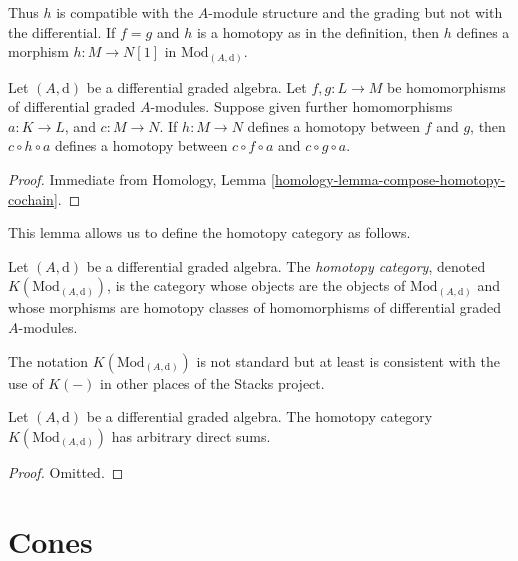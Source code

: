 \noindent
Thus $h$ is compatible with the $A$-module structure and the grading
but not with the differential. If $f = g$ and $h$ is a homotopy
as in the definition, then $h$ defines a morphism $h : M \to N[1]$
in $\text{Mod}_{(A, \text{d})}$.

\begin{lemma}
\label{lemma-compose-homotopy}
Let $(A, \text{d})$ be a differential graded algebra.
Let $f, g : L \to M$ be homomorphisms of differential graded $A$-modules.
Suppose given further homomorphisms $a : K \to L$, and $c : M \to N$.
If $h : M \to N$ defines a homotopy between $f$ and $g$, then
$c \circ h \circ a$ defines a homotopy between $c \circ f \circ a$ and
$c \circ g \circ a$.
\end{lemma}

\begin{proof}
Immediate from Homology, Lemma \ref{homology-lemma-compose-homotopy-cochain}.
\end{proof}

\noindent
This lemma allows us to define the homotopy category as follows.

\begin{definition}
\label{definition-complexes-notation}
Let $(A, \text{d})$ be a differential graded algebra.
The {\it homotopy category}, denoted $K(\text{Mod}_{(A, \text{d})})$, is
the category whose objects are the objects of
$\text{Mod}_{(A, \text{d})}$ and whose morphisms are homotopy classes
of homomorphisms of differential graded $A$-modules.
\end{definition}

\noindent
The notation $K(\text{Mod}_{(A, \text{d})})$ is not standard but at least is
consistent with the use of $K(-)$ in other places of the Stacks project.

\begin{lemma}
\label{lemma-homotopy-direct-sums}
Let $(A, \text{d})$ be a differential graded algebra.
The homotopy category $K(\text{Mod}_{(A, \text{d})})$
has arbitrary direct sums.
\end{lemma}

\begin{proof}
Omitted.
\end{proof}







\section{Cones}
\label{section-cones}

